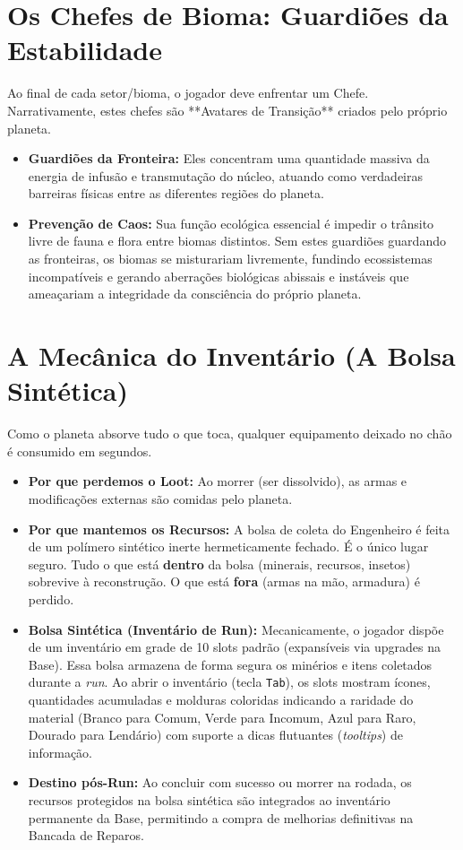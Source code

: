 \documentclass[a4paper,12pt]{report}
\begin{document}
\section{Os Chefes de Bioma: Guardiões da Estabilidade}
Ao final de cada setor/bioma, o jogador deve enfrentar um Chefe. Narrativamente, estes chefes são **Avatares de Transição** criados pelo próprio planeta.
\begin{itemize}
    \item \textbf{Guardiões da Fronteira:} Eles concentram uma quantidade massiva da energia de infusão e transmutação do núcleo, atuando como verdadeiras barreiras físicas entre as diferentes regiões do planeta.
    \item \textbf{Prevenção de Caos:} Sua função ecológica essencial é impedir o trânsito livre de fauna e flora entre biomas distintos. Sem estes guardiões guardando as fronteiras, os biomas se misturariam livremente, fundindo ecossistemas incompatíveis e gerando aberrações biológicas abissais e instáveis que ameaçariam a integridade da consciência do próprio planeta.
\end{itemize}

\section{A Mecânica do Inventário (A Bolsa Sintética)}
Como o planeta absorve tudo o que toca, qualquer equipamento deixado no chão é consumido em segundos.
\begin{itemize}
    \item \textbf{Por que perdemos o Loot:} Ao morrer (ser dissolvido), as armas e modificações externas são comidas pelo planeta.
    \item \textbf{Por que mantemos os Recursos:} A bolsa de coleta do Engenheiro é feita de um polímero sintético inerte hermeticamente fechado. É o único lugar seguro. Tudo o que está \textbf{dentro} da bolsa (minerais, recursos, insetos) sobrevive à reconstrução. O que está \textbf{fora} (armas na mão, armadura) é perdido.
    \item \textbf{Bolsa Sintética (Inventário de Run):} Mecanicamente, o jogador dispõe de um inventário em grade de 10 slots padrão (expansíveis via upgrades na Base). Essa bolsa armazena de forma segura os minérios e itens coletados durante a \textit{run}. Ao abrir o inventário (tecla \texttt{Tab}), os slots mostram ícones, quantidades acumuladas e molduras coloridas indicando a raridade do material (Branco para Comum, Verde para Incomum, Azul para Raro, Dourado para Lendário) com suporte a dicas flutuantes (\textit{tooltips}) de informação.
    \item \textbf{Destino pós-Run:} Ao concluir com sucesso ou morrer na rodada, os recursos protegidos na bolsa sintética são integrados ao inventário permanente da Base, permitindo a compra de melhorias definitivas na Bancada de Reparos.
\end{itemize}
\end{document}
